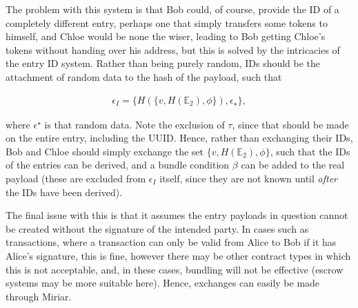 \documentclass{extreport}
\begin{document}
The problem with this system is that Bob could, of course, provide the ID of a completely different entry, perhaps one that simply transfers some tokens to himself, and Chloe would be none the wiser, leading to Bob getting Chloe's tokens without handing over his address, but this is solved by the intricacies of the entry ID system. Rather than being purely random, IDs should be the attachment of random data to the hash of the payload, such that

\begin{align*}
\epsilon_I = \{ H(\{ v, H(\mathbb{E}_2), \phi \}), \epsilon_\star \}, \tag{10.1}
\end{align*}

where \(\epsilon^\star\) is that random data. Note the exclusion of \(\tau\), since that should be made on the entire entry, including the UUID. Hence, rather than exchanging their IDs, Bob and Chloe should simply exchange the set \(\{ v, H(\mathbb{E}_2), \phi \}\), such that the IDs of the entries can be derived, and a bundle condition \(\beta\) can be added to the real payload (these are excluded from \(\epsilon_I\) itself, since they are not known until \emph{after} the IDs have been derived).

The final issue with this is that it assumes the entry payloads in question cannot be created without the signature of the intended party. In cases such as transactions, where a transaction can only be valid from Alice to Bob if it has Alice's signature, this is fine, however there may be other contract types in which this is not acceptable, and, in these cases, bundling will not be effective (escrow systems may be more suitable here). Hence, exchanges can easily be made through Miriar.
\end{document}
